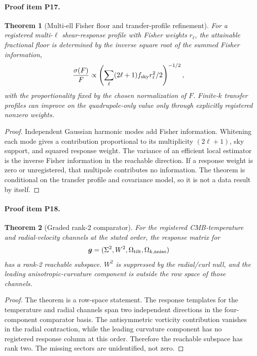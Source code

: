 \documentclass[11pt]{article}
\newcommand{\Sig}{\Sigma^2}
\newcommand{\Wsq}{W^2}
\newcommand{\Omt}{\Omega_{\rm tilt}}
\newcommand{\Omk}{\Omega_{k,{\rm aniso}}}
\newtheorem{theorem}{Theorem}
\begin{document}
\paragraph{Proof item P17.}
\begin{theorem}[Multi-ell Fisher floor and transfer-profile refinement]
For a registered multi-\(\ell\) shear-response profile with Fisher weights \(r_\ell\), the attainable fractional floor is determined by the inverse square root of the summed Fisher information,
\[
  \frac{\sigma(F)}{F}
  \propto
  \left(\sum_\ell (2\ell+1)f_{\rm sky}r_\ell^2/2\right)^{-1/2},
\]
with the proportionality fixed by the chosen normalization of \(F\).  Finite-\(k\) transfer profiles can improve on the quadrupole-only value only through explicitly registered nonzero weights.
\end{theorem}
\begin{proof}
Independent Gaussian harmonic modes add Fisher information.  Whitening each mode gives a contribution proportional to its multiplicity \((2\ell+1)\), sky support, and squared response weight.  The variance of an efficient local estimator is the inverse Fisher information in the reachable direction.  If a response weight is zero or unregistered, that multipole contributes no information.  The theorem is conditional on the transfer profile and covariance model, so it is not a data result by itself.
\end{proof}

\paragraph{Proof item P18.}
\begin{theorem}[Graded rank-2 comparator]
For the registered CMB-temperature and radial-velocity channels at the stated order, the response matrix for
\[
  \bm g=(\Sig,\Wsq,\Omt,\Omk)
\]
has a rank-2 reachable subspace.  \(W^2\) is suppressed by the radial/curl null, and the leading anisotropic-curvature component is outside the row space of those channels.
\end{theorem}
\begin{proof}
The theorem is a row-space statement.  The response templates for the temperature and radial channels span two independent directions in the four-component comparator basis.  The antisymmetric vorticity contribution vanishes in the radial contraction, while the leading curvature component has no registered response column at this order.  Therefore the reachable subspace has rank two.  The missing sectors are unidentified, not zero.
\end{proof}
\end{document}
